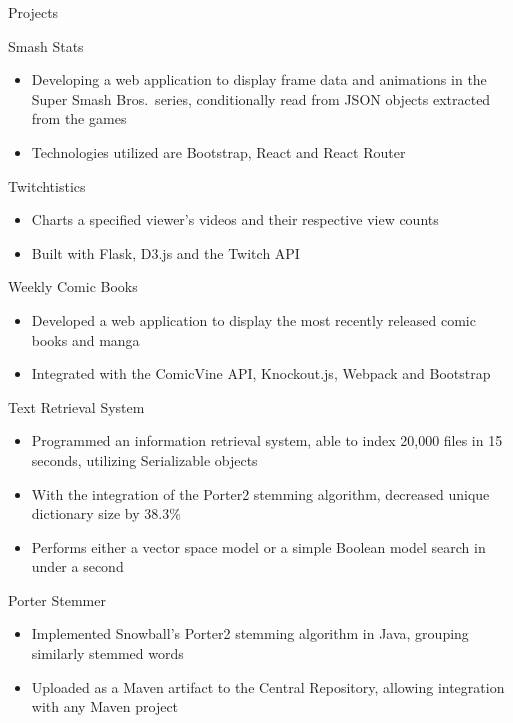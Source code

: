 \documentclass[]{xjavathehutt}
\begin{document}
\begin{cvsection}{Projects}
  \begin{cvsubsection}{Smash Stats}{}{}
    \begin{itemize}
      \item{Developing a web application to display frame data and animations in the Super Smash Bros.\ series, conditionally read from JSON objects extracted from the games}
      \item{Technologies utilized are Bootstrap, React and React Router}
    \end{itemize}
  \end{cvsubsection}

  \begin{cvsubsection}{Twitchtistics}{}{}
    \begin{itemize}
      \item{Charts a specified viewer's videos and their respective view counts}
      \item{Built with Flask, D3.js and the Twitch API}
    \end{itemize}
  \end{cvsubsection}
  
  \begin{cvsubsection}{Weekly Comic Books}{}{}
    \begin{itemize}
      \item{Developed a web application to display the most recently released comic books and manga}
      \item{Integrated with the ComicVine API, Knockout.js, Webpack and Bootstrap}
    \end{itemize}
  \end{cvsubsection}

  \begin{cvsubsection}{Text Retrieval System}{}{}
    \begin{itemize}
      \item{Programmed an information retrieval system, able to index 20,000 files in 15 seconds, utilizing Serializable objects}
      \item{With the integration of the Porter2 stemming algorithm, decreased unique dictionary size by 38.3\%}
      \item{Performs either a vector space model or a simple Boolean model search in under a second}
    \end{itemize}
  \end{cvsubsection}

  \begin{cvsubsection}{Porter Stemmer}{}{}
    \begin{itemize}
      \item{Implemented Snowball's Porter2 stemming algorithm in Java, grouping similarly stemmed words}
      \item{Uploaded as a Maven artifact to the Central Repository, allowing integration with any Maven project}
    \end{itemize}
    \end{cvsubsection}
  \end{cvsection}
\end{document}
